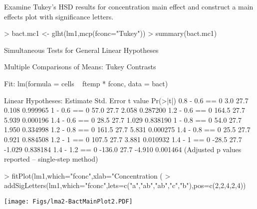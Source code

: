 \documentclass{article}
\begin{document}
\newpage
Examine Tukey's HSD results for concentration main effect and construct a main effects plot with significance letters.

\begin{Schunk}
\begin{Sinput}
> bact.mc1 <- glht(lm1,mcp(fconc="Tukey"))
> summary(bact.mc1)
\end{Sinput}
\begin{Soutput}
	 Simultaneous Tests for General Linear Hypotheses

Multiple Comparisons of Means: Tukey Contrasts


Fit: lm(formula = cells ~ ftemp * fconc, data = bact)

Linear Hypotheses:
               Estimate Std. Error t value Pr(>|t|)
0.8 - 0.6 == 0      3.0       27.7   0.108 0.999965
1 - 0.6 == 0       57.0       27.7   2.058 0.287200
1.2 - 0.6 == 0    164.5       27.7   5.939 0.000196
1.4 - 0.6 == 0     28.5       27.7   1.029 0.838190
1 - 0.8 == 0       54.0       27.7   1.950 0.334998
1.2 - 0.8 == 0    161.5       27.7   5.831 0.000275
1.4 - 0.8 == 0     25.5       27.7   0.921 0.884508
1.2 - 1 == 0      107.5       27.7   3.881 0.010932
1.4 - 1 == 0      -28.5       27.7  -1.029 0.838184
1.4 - 1.2 == 0   -136.0       27.7  -4.910 0.001464
(Adjusted p values reported -- single-step method)
\end{Soutput}
\begin{Sinput}
> fitPlot(lm1,which="fconc",xlab="Concentration (%)",ylab="Mean Number of Cells",main="")
> addSigLetters(lm1,which="fconc",lets=c("a","ab","ab","c","b"),pos=c(2,2,4,2,4))
\end{Sinput}
\end{Schunk}
\texttt{[image: Figs/lma2-BactMainPlot2.PDF]}


\newpage
\end{document}
